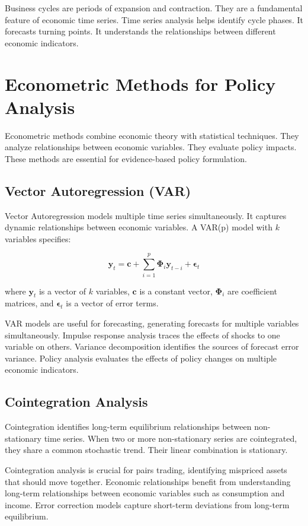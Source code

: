 Business cycles are periods of expansion and contraction. They are a fundamental feature of economic time series. Time series analysis helps identify cycle phases. It forecasts turning points. It understands the relationships between different economic indicators.

\section{Econometric Methods for Policy Analysis}

Econometric methods combine economic theory with statistical techniques. They analyze relationships between economic variables. They evaluate policy impacts. These methods are essential for evidence-based policy formulation.

\subsection{Vector Autoregression (VAR)}

Vector Autoregression models multiple time series simultaneously. It captures dynamic relationships between economic variables. A VAR(p) model with \(k\) variables specifies:

\[
\mathbf{y}_t = \mathbf{c} + \sum_{i=1}^{p} \mathbf{\Phi}_i \mathbf{y}_{t-i} + \boldsymbol{\epsilon}_t
\]

where \(\mathbf{y}_t\) is a vector of \(k\) variables, \(\mathbf{c}\) is a constant vector, \(\mathbf{\Phi}_i\) are coefficient matrices, and \(\boldsymbol{\epsilon}_t\) is a vector of error terms.

VAR models are useful for forecasting, generating forecasts for multiple variables simultaneously. Impulse response analysis traces the effects of shocks to one variable on others. Variance decomposition identifies the sources of forecast error variance. Policy analysis evaluates the effects of policy changes on multiple economic indicators.

\subsection{Cointegration Analysis}

Cointegration identifies long-term equilibrium relationships between non-stationary time series. When two or more non-stationary series are cointegrated, they share a common stochastic trend. Their linear combination is stationary.

Cointegration analysis is crucial for pairs trading, identifying mispriced assets that should move together. Economic relationships benefit from understanding long-term relationships between economic variables such as consumption and income. Error correction models capture short-term deviations from long-term equilibrium.

